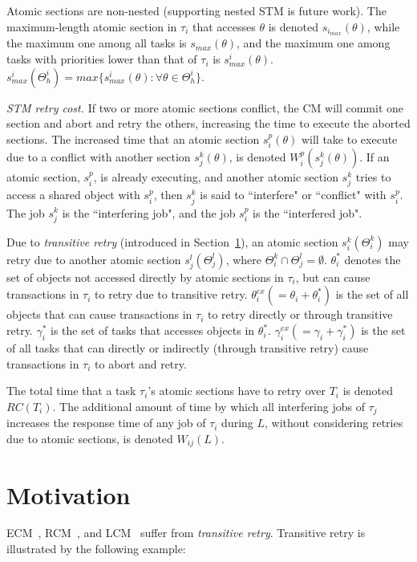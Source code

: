 \documentclass[conference,letterpaper]{IEEEtran}
\begin{document}
Atomic sections are non-nested (supporting nested STM is future work). The maximum-length atomic section in $\tau_i$ that accesses $\theta$ is denoted $s_{i_{max}} (\theta)$, while the maximum one among all tasks is $s_{max} (\theta)$, and the maximum one among tasks with priorities lower than that of $\tau_i$ is $s_{max}^i (\theta)$. $s_{max}^i(\Theta_h^i)=max\{s_{max}^i(\theta):\forall \theta \in \Theta_h^i\}$.

\textit{STM retry cost.} If two or more atomic sections conflict, the CM will commit one section and abort and retry the others, increasing the time to execute the aborted sections. The increased time that an atomic section $s_i^p (\theta)$ will take to execute due to a conflict with another section $s_j^k (\theta)$, is denoted $W_{i}^{p}(s_{j}^{k}(\theta))$. If an atomic section, $s_i^p$, is already executing, and another atomic section $s_j^k$ tries to access a shared object with $s_i^p$, then $s_j^k$ is said to ``interfere" or ``conflict" with $s_i^p$. The job $s_j^k$ is the ``interfering job", and the job $s_i^p$ is the ``interfered job".

Due to \textit{transitive retry} (introduced in Section~\ref{sec:motivation}), an atomic section $s_i^k(\Theta_i^k)$ may retry due to another atomic section $s_j^l(\Theta_j^l)$, where $\Theta_i^k \cap \Theta_j^l = \emptyset$. $\theta_i^*$ denotes the set of objects not accessed directly by atomic sections in $\tau_i$, but can cause transactions in $\tau_i$ to retry due to transitive retry. $\theta_i^{ex}(=\theta_i + \theta_i^*)$ is the set of all objects that can cause transactions in $\tau_i$ to retry directly or through transitive retry. $\gamma_i^*$ is the set of tasks that accesses  objects in $\theta_i^*$. $\gamma_i^{ex}(=\gamma_i + \gamma_i^*)$ is the set of all tasks that can directly or indirectly (through transitive retry) cause transactions in $\tau_i$ to abort and retry.

The total time that a task $\tau_i$'s atomic sections have to retry over $T_i$ is denoted $RC(T_i)$. The additional amount of time by which all interfering jobs of $\tau_j$ increases the response time of any job of $\tau_i$ during $L$, without considering retries due to atomic sections, is denoted $W_{ij}(L)$.

\section{Motivation}
\label{sec:motivation}

ECM~\cite{stmconcurrencycontrol:emsoft11}, RCM~\cite{stmconcurrencycontrol:emsoft11}, and LCM~\cite{lcmdac2012} suffer from \textit{transitive retry}. Transitive retry is illustrated by the following example:
\end{document}
